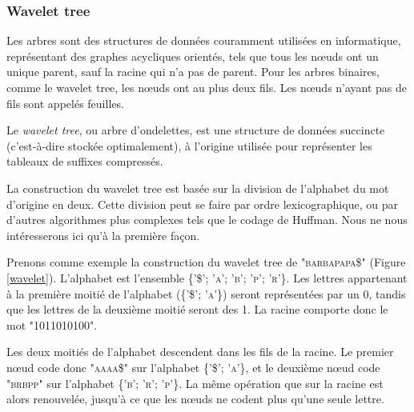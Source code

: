 \subsubsection{Wavelet tree}
Les arbres sont des structures de données couramment utilisées en informatique, représentant des graphes acycliques orientés, tels que tous les nœuds ont un unique parent, sauf la racine qui n'a pas de parent. Pour les arbres binaires, comme le wavelet tree, les nœuds ont au plus deux fils. Les nœuds n'ayant pas de fils sont appelés feuilles.

Le \textit{wavelet tree}, ou arbre d'ondelettes, est une structure de données succincte (c'est-à-dire stockée optimalement), à l'origine utilisée pour représenter les tableaux de suffixes compressés.

La construction du wavelet tree est basée sur la division de l'alphabet du mot d'origine en deux. Cette division peut se faire par ordre lexicographique, ou par d'autres algorithmes plus complexes tels que le codage de Huffman. Nous ne nous intéresserons ici qu'à la première façon.

Prenons comme exemple la construction du wavelet tree de \textsc{"barbapapa\$"} (Figure \ref{wavelet}). L'alphabet est l'ensemble \textsc{\{'\$'; 'a'; 'b'; 'p'; 'r'\}}. Les lettres appartenant à la première moitié de l'alphabet (\textsc{\{'\$'; 'a'\}}) seront représentées par un 0, tandis que les lettres de la deuxième moitié seront des 1. La racine comporte donc le mot "1011010100".

Les deux moitiés de l'alphabet descendent dans les fils de la racine. Le premier nœud code donc \textsc{"aaaa\$"} sur l'alphabet \textsc{\{'\$'; 'a'\}}, et le deuxième nœud code \textsc{"brbpp"} sur l'alphabet \textsc{\{'b'; 'r'; 'p'\}}. La même opération que sur la racine est alors renouvelée, jusqu'à ce que les nœuds ne codent plus qu'une seule lettre.

